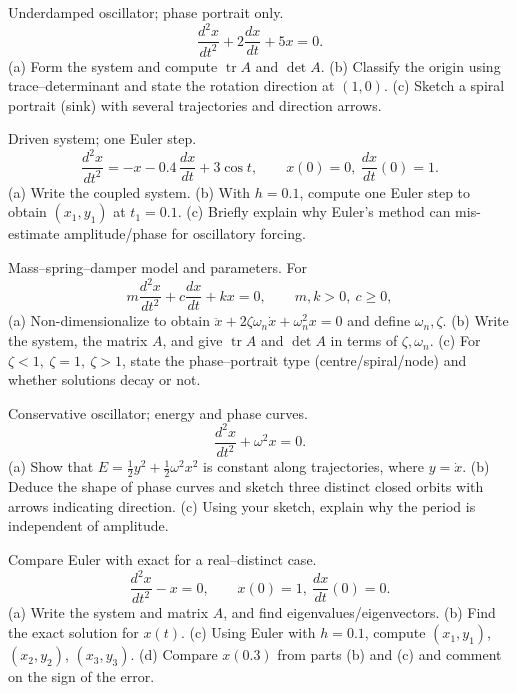 \documentclass[11pt]{article}
\def\textbf#1{#1}%
\newcounter{question}
\begin{document}
\begin{question}
\textbf{Underdamped oscillator; phase portrait only.}
\[
\frac{d^{2}x}{dt^{2}}+2\frac{dx}{dt}+5x=0.
\]
(a) Form the system and compute \(\operatorname{tr}A\) and \(\det A\).  
(b) Classify the origin using trace–determinant and state the rotation direction at \((1,0)\).  
(c) Sketch a spiral portrait (sink) with several trajectories and direction arrows.
\end{question}

\begin{question}
\textbf{Driven system; one Euler step.}
\[
\frac{d^{2}x}{dt^{2}}=-x-0.4\,\frac{dx}{dt}+3\cos t,\qquad x(0)=0,\ \frac{dx}{dt}(0)=1.
\]
(a) Write the coupled system.  
(b) With \(h=0.1\), compute one Euler step to obtain \((x_1,y_1)\) at \(t_1=0.1\).  
(c) Briefly explain why Euler’s method can mis-estimate amplitude/phase for oscillatory forcing.
\end{question}

\begin{question}
\textbf{Mass–spring–damper model and parameters.}
For
\[
m\frac{d^{2}x}{dt^{2}}+c\frac{dx}{dt}+kx=0,\qquad m,k>0,\ c\ge0,
\]
(a) Non-dimensionalize to obtain \(\ddot x+2\zeta\omega_n \dot x+\omega_n^2 x=0\) and define \(\omega_n,\zeta\).  
(b) Write the system, the matrix \(A\), and give \(\operatorname{tr}A\) and \(\det A\) in terms of \(\zeta,\omega_n\).  
(c) For \(\zeta<1,\ \zeta=1,\ \zeta>1\), state the phase–portrait type (centre/spiral/node) and whether solutions decay or not.
\end{question}

\begin{question}
\textbf{Conservative oscillator; energy and phase curves.}
\[
\frac{d^{2}x}{dt^{2}}+\omega^{2}x=0.
\]
(a) Show that \(E=\tfrac12 y^{2}+\tfrac12 \omega^{2}x^{2}\) is constant along trajectories, where \(y=\dot x\).  
(b) Deduce the shape of phase curves and sketch three distinct closed orbits with arrows indicating direction.  
(c) Using your sketch, explain why the period is independent of amplitude.
\end{question}

\begin{question}
\textbf{Compare Euler with exact for a real–distinct case.}
\[
\frac{d^{2}x}{dt^{2}}-x=0,\qquad x(0)=1,\ \frac{dx}{dt}(0)=0.
\]
(a) Write the system and matrix \(A\), and find eigenvalues/eigenvectors.  
(b) Find the exact solution for \(x(t)\).  
(c) Using Euler with \(h=0.1\), compute \((x_{1},y_{1})\), \((x_{2},y_{2})\), \((x_{3},y_{3})\).  
(d) Compare \(x(0.3)\) from parts (b) and (c) and comment on the sign of the error.
\end{question}
\end{document}
